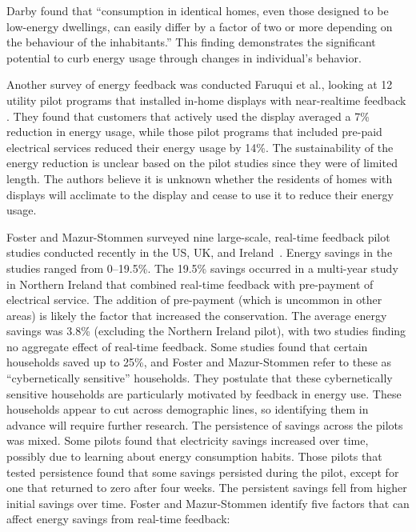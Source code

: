 Darby found that ``consumption in identical homes, even those designed to be low-energy dwellings, can easily differ by a factor of two or more depending on the behaviour of the inhabitants.'' This finding demonstrates the significant potential to curb energy usage through changes in individual's behavior.

Another survey of energy feedback was conducted Faruqui et al., looking at 12 utility pilot programs that installed in-home displays with near-realtime feedback \cite{Faruqui09}. They found that customers that actively used the display averaged a 7\% reduction in energy usage, while those pilot programs that included pre-paid electrical services reduced their energy usage by 14\%. The sustainability of the energy reduction is unclear based on the pilot studies since they were of limited length. The authors believe it is unknown whether the residents of homes with displays will acclimate to the display and cease to use it to reduce their energy usage.

Foster and Mazur-Stommen surveyed nine large-scale, real-time feedback pilot studies conducted recently in the US, UK, and Ireland~\cite{Foster-2012}. Energy savings in the studies ranged from 0--19.5\%. The 19.5\% savings occurred in a multi-year study in Northern Ireland that combined real-time feedback with pre-payment of electrical service. The addition of pre-payment (which is uncommon in other areas) is likely the factor that increased the conservation. The average energy savings was 3.8\% (excluding the Northern Ireland pilot), with two studies finding no aggregate effect of real-time feedback. Some studies found that certain households saved up to 25\%, and Foster and Mazur-Stommen refer to these as ``cybernetically sensitive'' households. They postulate that these cybernetically sensitive households are particularly motivated by feedback in energy use. These households appear to cut across demographic lines, so identifying them in advance will require further research. The persistence of savings across the pilots was mixed. Some pilots found that electricity savings increased over time, possibly due to learning about energy consumption habits. Those pilots that tested persistence found that some savings persisted during the pilot, except for one that returned to zero after four weeks. The persistent savings fell from higher initial savings over time. Foster and Mazur-Stommen identify five factors that can affect energy savings from real-time feedback:

